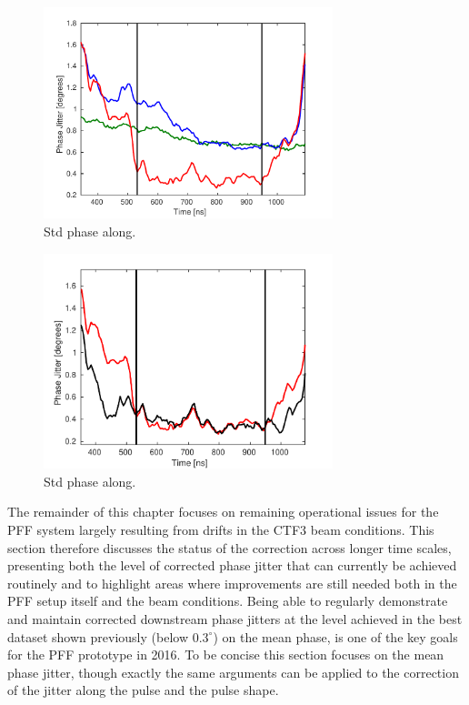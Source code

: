 \begin{figure}
  \centering
  \includegraphics[width=0.75\textwidth]{Figures/feedforward/BestFF_StdPhaseAlong}
  \caption{Std phase along.}
  \label{f:BestFF_StdPhaseAlong}
\end{figure}

\begin{figure}
  \centering
  \includegraphics[width=0.75\textwidth]{Figures/feedforward/BestFF_SimStdAlongPulse}
  \caption{Std phase along.}
  \label{f:BestFF_SimStdPhaseAlong}
\end{figure}


The remainder of this chapter focuses on remaining operational issues for the PFF system largely resulting from drifts in the CTF3 beam conditions. This section therefore discusses the status of the correction across longer time scales, presenting both the level of corrected phase jitter that can currently be achieved routinely and to highlight areas where improvements are still needed both in the PFF setup itself and the beam conditions. Being able to regularly demonstrate and maintain corrected downstream phase jitters at the level achieved in the best dataset shown previously (below \(0.3^\circ\)) on the mean phase, is one of the key goals for the PFF prototype in 2016. To be concise this section focuses on the mean phase jitter, though exactly the same arguments can be applied to the correction of the jitter along the pulse and the pulse shape.

